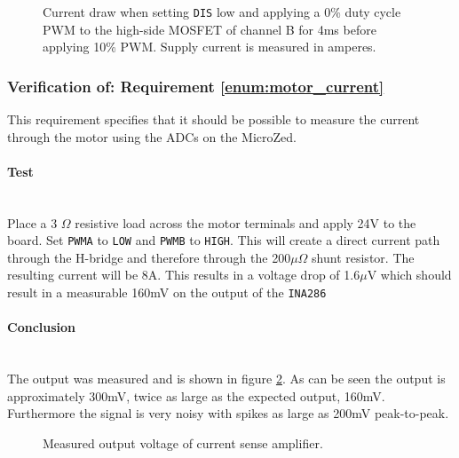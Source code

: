 \begin{figure}[h]
	\centering
	\caption[Main power supply current draw, 0\% duty cycle.]{Current draw when setting \texttt{DIS} low and applying a 0\% duty cycle PWM to the high-side MOSFET of channel B for 4ms before applying 10\% PWM. Supply current is measured in amperes.}
	\label{fig:current_w_load_slow}
\end{figure}

\subsubsection{Verification of: Requirement \ref{enum:motor_current}} %
\label{ssub:requrement_enum:motor_current_}
This requirement specifies that it should be possible to measure the current through the motor using the ADCs on the MicroZed.

\paragraph{Test}~\\
Place a 3 $\Omega$ resistive load across the motor terminals and apply 24V to the board.
Set \texttt{PWMA} to \texttt{LOW} and \texttt{PWMB} to \texttt{HIGH}.
This will create a direct current path through the H-bridge and therefore through the 200$\mu\Omega$ shunt resistor.
The resulting current will be 8A.
This results in a voltage drop of 1.6$\mu$V which should result in a measurable 160mV on the output of the \texttt{INA286}

\paragraph{Conclusion}~\\
The output was measured and is shown in figure \ref{fig:controllerboardv2_current_sense}.
As can be seen the output is approximately 300mV, twice as large as the expected output, 160mV.
Furthermore the signal is very noisy with spikes as large as 200mV peak-to-peak. 

\begin{figure}[h]
\centering
%
\caption{Measured output voltage of current sense amplifier.}
\label{fig:controllerboardv2_current_sense}
\end{figure}

